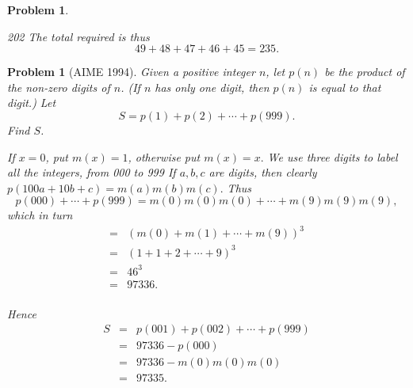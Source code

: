 \documentclass[11pt, openany]{book}
\theoremstyle{change} \theoremheaderfont{\blue\sffamily\bfseries}
\newtheorem{pro}[thm]{Problem}
\theoremstyle{nonumberplain} \theoremheaderfont{\sffamily\bfseries}
\newcommand{\í}{\'{\i}}
\begin{document}
\begin{multicols}{2}
\begin{pro}
\begin{answer}
\begin{dingautolist}{202}
The total required is thus
$$49 + 48 + 47 + 46 + 45 = 235.$$
\end{dingautolist}
\end{answer}
\end{pro}
\begin{pro}[AIME 1994] Given a positive integer $n$, let $p(n)$ be
the product of the non-zero digits of $n$. (If $n$ has only one
digit, then $p(n)$ is equal to that digit.) Let
$$ S = p(1) + p(2) + \cdots + p(999).$$ Find $S$.
\begin{answer}  If $x = 0$, put $m(x) = 1$, otherwise put $m(x) = x.$ We use
three digits to label all the integers, from 000 to 999 If $a, b, c$
are digits, then clearly $p(100a + 10b + c) = m(a)m(b)m(c).$ Thus
$$ p(000) + \cdots + p(999)
 = m(0)m(0)m(0) +\cdots + m(9)m(9)m(9),  $$
which in turn
$$
\begin{array}{ll}
   = & (m(0) + m(1) + \cdots + m(9))^3 \\
 = & (1 + 1 + 2 + \cdots + 9)^3 \\
 = & 46^3 \\
 = & 97336.  \\
\end{array}
$$

Hence$$ \begin{array}{lll} S &  = & p(001) + p(002) + \cdots +
p(999)\\
 & = &  97336 - p(000)\\
 & = & 97336 - m(0)m(0)m(0)\\
 & = &  97335.\\
 \end{array}$$
\end{answer}
\end{pro}


\end{multicols}
\end{document}
